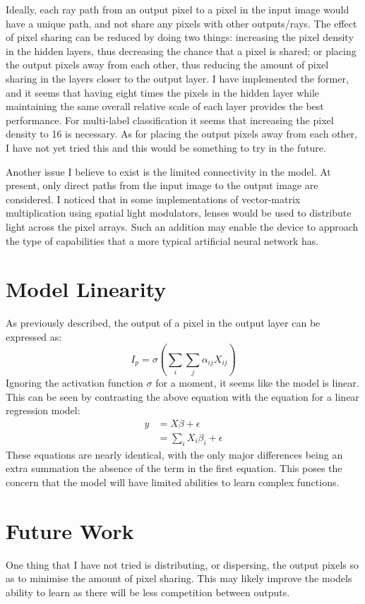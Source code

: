 \documentclass[]{article}
\begin{document}
Ideally, each ray path from an output pixel to a pixel in the input image would have a unique path, and not share any pixels with other outputs/rays. The effect of pixel sharing can be reduced by doing two things: increasing the pixel density in the hidden layers, thus decreasing the chance that a pixel is shared; or placing the output pixels away from each other, thus reducing the amount of pixel sharing in the layers closer to the output layer. I have implemented the former, and it seems that having eight times the pixels in the hidden layer while maintaining the same overall relative scale of each layer provides the best performance. For multi-label classification it seems that increasing the pixel density to 16 is necessary. As for placing the output pixels away from each other, I have not yet tried this and this would be something to try in the future.

Another issue I believe to exist is the limited connectivity in the model. At present, only direct paths from the input image to the output image are considered. I noticed that in some implementations of vector-matrix multiplication using spatial light modulators, lenses would be used to distribute light across the pixel arrays. Such an addition may enable the device to approach the type of capabilities that a more typical artificial neural network has.

\section{Model Linearity}
As previously described, the output of a pixel in the output layer can be expressed as:
$$I_p=\sigma(\sum_{i}\sum_{j}\alpha_{ij}X_{ij})$$
Ignoring the activation function $\sigma$ for a moment, it seems like the model is linear. This can be seen by contrasting the above equation with the equation for a linear regression model:
\begin{equation*}
\begin{aligned}
y &= X\beta + \epsilon \\
  &= \sum_{i}X_i\beta_i + \epsilon
\end{aligned}
\end{equation*}
These equations are nearly identical, with the only major differences being an extra summation the absence of the term  in the first equation. This poses the concern that the model will have limited abilities to learn complex functions.

\section{Future Work}
One thing that I have not tried is distributing, or dispersing, the output pixels so as to minimise the amount of pixel sharing. This may likely improve the models ability to learn as there will be less competition between outputs.
\end{document}
